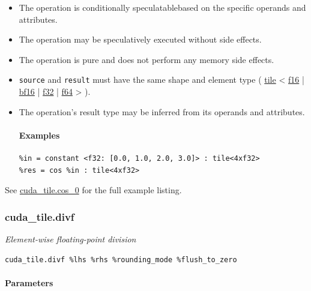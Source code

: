 \documentclass{article}
\begin{document}
\begin{itemize}
\item The operation is conditionally speculatablebased on the specific operands and attributes.
\item The operation may be speculatively executed without side effects.
\item The operation is pure and does not perform any memory side effects.
\item \texttt{source} and \texttt{result} must have the same shape and element type ( \href{https://docs.nvidia.com/cuda/tile-ir/latest/sections/types.html#type-tile}{tile} < \href{https://docs.nvidia.com/cuda/tile-ir/latest/sections/types.html#subsection-element-types}{f16} | \href{https://docs.nvidia.com/cuda/tile-ir/latest/sections/types.html#subsection-element-types}{bf16} | \href{https://docs.nvidia.com/cuda/tile-ir/latest/sections/types.html#subsection-element-types}{f32} | \href{https://docs.nvidia.com/cuda/tile-ir/latest/sections/types.html#subsection-element-types}{f64} > ).
\item The operation's result type may be inferred from its operands and attributes.


\paragraph{Examples}

\begin{lstlisting}
%in = constant <f32: [0.0, 1.0, 2.0, 3.0]> : tile<4xf32>
%res = cos %in : tile<4xf32>
\end{lstlisting}

\end{itemize}
See \href{https://docs.nvidia.com/cuda/tile-ir/latest/sections/appendix.html#example-cuda-tile-cos-0}{cuda\_tile.cos\_0} for the full example listing.



\subsubsection{cuda\_tile.divf}

\textit{Element-wise floating-point division}


\begin{lstlisting}
cuda_tile.divf %lhs %rhs %rounding_mode %flush_to_zero
\end{lstlisting}

\paragraph{Parameters}
\end{document}
